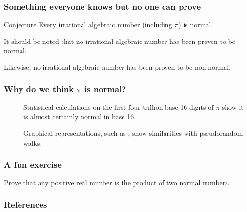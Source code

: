 \documentclass{beamer}
\begin{document}
\begin{frame}
\frametitle{Something everyone knows but no one can prove}
\begin{block}{Conjecture}
Every irrational algebraic number (including $\pi$) is normal.
\end{block}

It should be noted that no irrational algebraic number has been proven to be normal.

Likewise, no irrational algebraic number has been proven to be non-normal.
\end{frame}

\begin{frame}
\frametitle{Why do we think $\pi$ is normal?}
\begin{description}
\item[\cite{bailey2012empirical}] Statistical calculations on the first four trillion base-16 digits of $\pi$ show it is almost certainly normal in base 16.
\item[\cite{artacho2012walking}] Graphical representations, such as \href{http://gigapan.org/gigapans/106803}{\color{blue}{this one of 100 billion base-4 digits of $\pi$}}, show similarities with pseudorandom walks.
\end{description}
\end{frame}

\begin{frame}
\frametitle{A fun exercise}
Prove that any positive real number is the product of two normal numbers.
\end{frame}

\begin{frame}[allowframebreaks]
\frametitle{References}


%
\end{frame}
\end{document}
